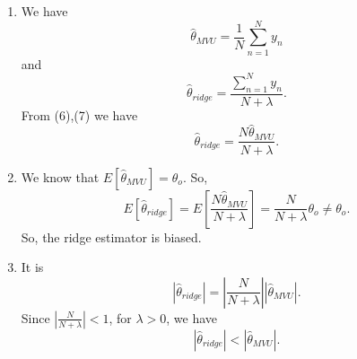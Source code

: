 \documentclass[12pt]{book}
\begin{document}
\begin{enumerate}[label=(\alph*)]
	\item We have
	\begin{equation}
	\hat{\theta}_{MVU}=\frac{1}{N} \sum_{n=1}^{N} y_n
	\end{equation}  and 
	\begin{equation}
	\hat{\theta}_{ridge} = \frac{\sum_{n=1}^{N}y_n}{N+\lambda}.
	\end{equation}
	From (6),(7) we have
	\begin{equation*}
	\hat{\theta}_{ridge} = \frac{N\hat{\theta}_{MVU}}{N+\lambda}.
	\end{equation*}
	\item We know that $E[\hat{\theta}_{MVU}]=\theta_o$. So,
	\begin{equation*}
	E[\hat{\theta}_{ridge}] = E[\frac{N\hat{\theta}_{MVU}}{N+\lambda}] = \frac{N}{N+\lambda} \theta_o \neq \theta_o.
	\end{equation*}
	So, the ridge estimator is biased.
	\item It is 
	\begin{equation*}
		|\hat{\theta}_{ridge}| = |\frac{N}{N+\lambda}||\hat{\theta}_{MVU}|.
	\end{equation*}
	Since $|\frac{N}{N+\lambda}|<1$, for $\lambda>0$, we have
	\begin{equation*}
	|\hat{\theta}_{ridge}|<|\hat{\theta}_{MVU}|.
	\end{equation*}
	\end{enumerate}
\end{document}
